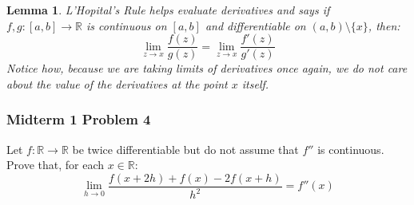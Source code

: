 \documentclass[10pt,letterpaper]{article} %
\newtheorem{lem}{Lemma}[section]
\begin{document}
\medskip
\begin{lem}
L'Hopital's Rule helps evaluate derivatives and says if $f, g: [a, b] \xrightarrow{} \mathbb{R}$ is continuous on $[a, b]$ and differentiable on $(a, b)\setminus \{x\}$, then:
\begin{equation*}
\lim_{z \xrightarrow{} x}\frac{f(z)}{g(z)} = \lim_{z \xrightarrow{} x}\frac{f'(z)}{g'(z)}
\end{equation*}
Notice how, because we are taking limits of derivatives once again, we do not care about the value of the derivatives at the point $x$ itself. 
\end{lem}

\medskip
\subsubsection{Midterm 1 Problem 4}
Let $f: \mathbb{R} \xrightarrow{} \mathbb{R}$ be twice differentiable but do not assume that $f''$ is continuous. Prove that, for each $x \in \mathbb{R}$:
\begin{equation*}
\lim_{h \xrightarrow{} 0}\frac{f(x+2h) + f(x) - 2f(x+h)}{h^2} = f''(x)
\end{equation*}
\end{document}
